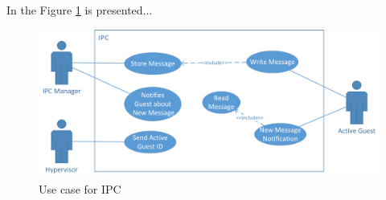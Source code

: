 
In the Figure \ref{img_usecase} is presented...

\begin{figure} [!h]
	\centering
	\includegraphics[width=\textwidth]{Figures/use_case} 
	\caption[Use case for IPC]{Use case for IPC}
	\label{img_usecase}
\end{figure}


